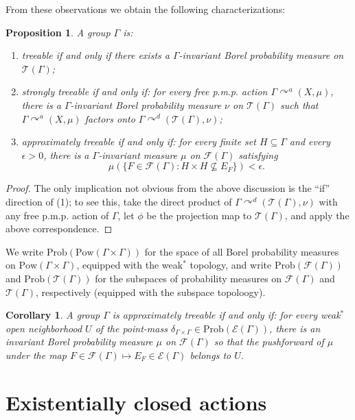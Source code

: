 \documentclass[12pt]{amsart}
\newtheorem{prop}[thm]{Proposition}
\newtheorem{cor}[thm]{Corollary}
\theoremstyle{definition}
\def\cal{\mathcal}
\newcommand{\pmp}{p{$.$}m{$.$}p{$.$}}
\newcommand{\acts}{\curvearrowright}
\newcommand{\Prob}{\mathrm{Prob}}
\newcommand{\Pow}[1]{\mathrm{Pow}(#1)}
\begin{document}
From these observations we obtain the following characterizations:

\begin{prop}
A group $\Gamma$ is:
\begin{enumerate}
    \item treeable if and only if there exists a $\Gamma$-invariant Borel probability measure on $\cal T(\Gamma)$;
    \item strongly treeable if and only if: for every free {\pmp} action $\Gamma \acts^a (X, \mu)$, there is a $\Gamma$-invariant Borel probability measure $\nu$ on $\cal T(\Gamma)$ such that $\Gamma \acts^a (X, \mu)$ factors onto $\Gamma \acts^d (\cal T(\Gamma), \nu)$;
    \item approximately treeable if and only if: for every finite set $H \subseteq \Gamma$ and every $\epsilon > 0$, there is a $\Gamma$-invariant measure $\mu$ on $\cal F(\Gamma)$ satisfying
\[\mu(\{F \in \cal F(\Gamma) : H \times H \not\subseteq E_F\}) < \epsilon.\]
\end{enumerate}
\end{prop}

\begin{proof}
The only implication not obvious from the above discussion is the ``if'' direction of (1); to see this, take the direct product of $\Gamma \acts^d (\cal T(\Gamma), \nu)$ with any free {\pmp} action of $\Gamma$, let $\phi$ be the projection map to $\cal T(\Gamma)$, and apply the above correspondence.
\end{proof}

We write $\Prob(\Pow{\Gamma \times \Gamma})$ for the space of all Borel probability measures on $\Pow{\Gamma \times \Gamma}$, equipped with the weak$^*$ topology, and write $\Prob(\cal F(\Gamma))$ and $\Prob(\cal T(\Gamma))$ for the subspaces of probability measures on $\cal F(\Gamma)$ and $\cal T(\Gamma)$, respectively (equipped with the subspace topoloogy). 

\begin{cor}
A group $\Gamma$ is approximately treeable if and only if: for every weak$^*$ open neighborhood $U$ of the point-mass $\delta_{\Gamma \times \Gamma} \in \Prob(\cal E(\Gamma))$, there is an invariant Borel probability measure $\mu$ on $\cal F(\Gamma)$ so that the pushforward of $\mu$ under the map $F \in \cal F(\Gamma) \mapsto E_F \in \cal E(\Gamma)$ belongs to $U$.
\end{cor}

\section{Existentially closed actions}
\end{document}
